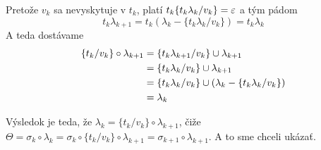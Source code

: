 \begin{dokaz}
\begin{itemize}
        Pretože $v_k$ sa nevyskytuje v $t_k$, platí
        $t_k \{ t_k\lambda_k / v_k\} = \varepsilon$ a tým pádom
        \begin{equation*}
            t_k \lambda_{k+1} = t_k (\lambda_k - \{t_k\lambda_k / v_k\}) 
            =t_k \lambda_k
        \end{equation*}
        A teda dostávame
        \begin{equation*}
        \begin{split}
            \{ t_k / v_k\} \circ \lambda_{k+1} &= 
            \{t_k \lambda_{k+1}/v_k \} \cup \lambda_{k+1} \\
            & = \{t_k \lambda_k/v_k \} \cup \lambda_{k+1} \\
            & = \{t_k \lambda_k/v_k\} \cup 
                ( \lambda_k - \{ t_k\lambda_k/v_k\}) \\ 
            &= \lambda_k
        \end{split}
        \end{equation*}

        Výsledok je teda, že 
        $\lambda_{k} = \{ t_k / v_k \} \circ \lambda_{k+1}$,
        čiže $\Theta = \sigma_k \circ \lambda_k
            = \sigma_k \circ \{t_k/v_k\} \circ \lambda_{k+1}
            = \sigma_{k+1} \circ \lambda_{k+1}$. A to sme chceli
            ukázať.
    \end{itemize}
\end{dokaz}
